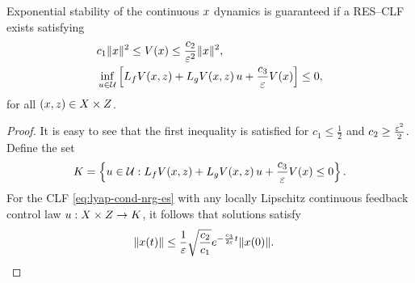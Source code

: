 \documentclass[twocolumn]{article}
\begin{document}
\begin{proposition}  
  Exponential stability of the continuous $x$ dynamics is guaranteed if a RES--CLF exists satisfying
  \begin{align}
    \label{eq:lyap-cond-nrg-es}
    &c_{1} \| x \|^{2} \leq V(x) \leq \frac{c_{2}}{\varepsilon^{2}} \| x \|^2,\\
    \nonumber
    &\inf_{u \in \mathcal{U}} \left[ L_{f} V(x, z) + L_{g} V(x, z) \, u + \frac{c_{3}}{\varepsilon} V(x) \right] \leq 0,
  \end{align}
  for all $(x, z) \in X \times Z$.
\end{proposition}


\begin{proof}
  It is easy to see that the first inequality is satisfied for $c_{1} \leq \frac{1}{2}$ and $c_{2} \geq \frac{\varepsilon^{2}}{2}$.
  Define the set
  \begin{align}
    K = \left\{ u \in \mathcal{U} : L_{f} V(x, z) + L_{g} V(x, z) \, u + \frac{c_{3}}{\varepsilon} V(x) \leq 0 \right\}.
    \label{eq:control-set}
  \end{align}
  For the CLF \eqref{eq:lyap-cond-nrg-es} with any locally Lipschitz continuous feedback control law $u : X \times Z \to K$, it follows that solutions satisfy
  \begin{align*}
    \| x(t) \| \leq \frac{1}{\varepsilon} \sqrt{\frac{c_{2}}{c_{1}}} e^{-\frac{c_{3}}{2\varepsilon} t} \| x(0) \|. & \qedhere
  \end{align*}
  
\end{proof}
\end{document}
